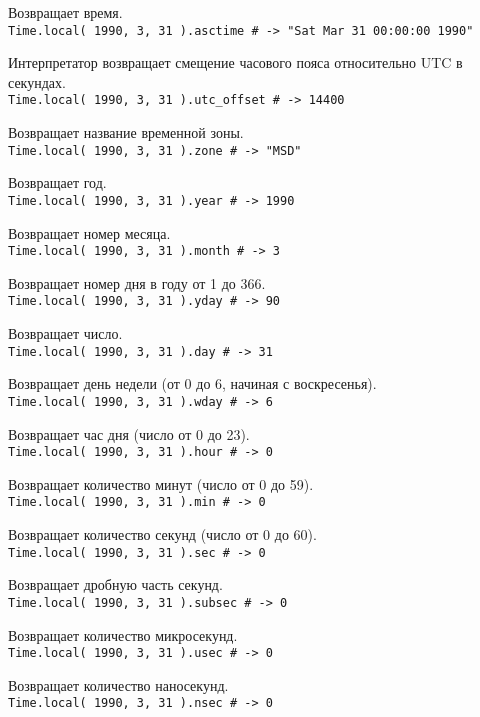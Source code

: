 \begin{methodlist}
  Возвращает время. 
  \\\verb!Time.local( 1990, 3, 31 ).asctime # -> "Sat Mar 31 00:00:00 1990"!
 
  Интерпретатор возвращает смещение часового пояса относительно UTC в секундах. 
  \\\verb!Time.local( 1990, 3, 31 ).utc_offset # -> 14400!
 
  Возвращает название временной зоны. 
  \\\verb!Time.local( 1990, 3, 31 ).zone # -> "MSD"!

  Возвращает год. 
  \\\verb!Time.local( 1990, 3, 31 ).year # -> 1990!
 
  Возвращает номер месяца. 
  \\\verb!Time.local( 1990, 3, 31 ).month # -> 3!
 
  Возвращает номер дня в году от 1 до 366. 
  \\\verb!Time.local( 1990, 3, 31 ).yday # -> 90!
 
  Возвращает число. 
  \\\verb!Time.local( 1990, 3, 31 ).day # -> 31!
 
  Возвращает день недели (от 0 до 6, начиная с воскресенья). 
  \\\verb!Time.local( 1990, 3, 31 ).wday # -> 6!

  Возвращает час дня (число от 0 до 23). 
  \\\verb!Time.local( 1990, 3, 31 ).hour # -> 0!
 
  Возвращает количество минут (число от 0 до 59). 
  \\\verb!Time.local( 1990, 3, 31 ).min # -> 0!
 
  Возвращает количество секунд (число от 0 до 60). 
  \\\verb!Time.local( 1990, 3, 31 ).sec # -> 0!
 
  Возвращает дробную часть секунд. 
  \\\verb!Time.local( 1990, 3, 31 ).subsec # -> 0!
 
  Возвращает количество микросекунд. 
  \\\verb!Time.local( 1990, 3, 31 ).usec # -> 0!
 
  Возвращает количество наносекунд. 
  \\\verb!Time.local( 1990, 3, 31 ).nsec # -> 0!
\end{methodlist}

